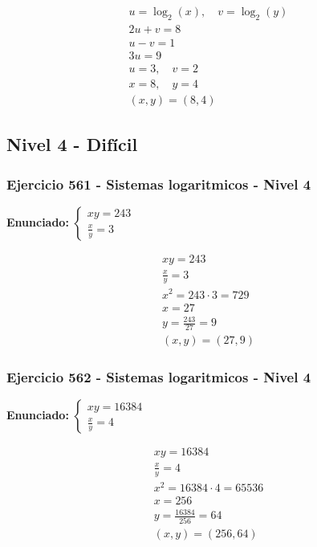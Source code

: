 \documentclass[12pt,a4paper]{article}
\begin{document}
\[
\begin{aligned}
u=\log_{2}\left(x\right),\quad v=\log_{2}\left(y\right)\\
2u+v=8\\
u-v=1\\
3u=9\\
u=3,\quad v=2\\
x=8,\quad y=4\\
\boxed{(x,y)=(8,4)}
\end{aligned}
\]


\newpage

\subsection*{Nivel 4 - Difícil}

\subsubsection*{Ejercicio 561 - Sistemas logaritmicos - Nivel 4}
\textbf{Enunciado:} \(\begin{cases} xy=243\\ \frac{x}{y}=3\end{cases}\)

\[
\begin{aligned}
xy=243\\
\frac{x}{y}=3\\
x^2=243\cdot 3=729\\
x=27\\
y=\frac{243}{27}=9\\
\boxed{(x,y)=(27,9)}
\end{aligned}
\]


\subsubsection*{Ejercicio 562 - Sistemas logaritmicos - Nivel 4}
\textbf{Enunciado:} \(\begin{cases} xy=16384\\ \frac{x}{y}=4\end{cases}\)

\[
\begin{aligned}
xy=16384\\
\frac{x}{y}=4\\
x^2=16384\cdot 4=65536\\
x=256\\
y=\frac{16384}{256}=64\\
\boxed{(x,y)=(256,64)}
\end{aligned}
\]
\end{document}
